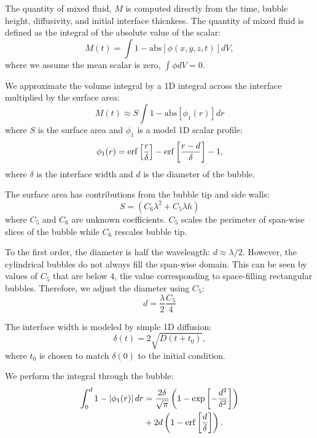 The quantity of mixed fluid, $M$ is computed directly from the time, bubble height, diffusivity, and initial interface thicnkess.
The quantity of mixed fluid is defined as the integral of the absolute value of the scalar:
\begin{equation}
M(t) = \int 1-\text{abs}\left[\phi(x,y,z,t)\right] dV,
\end{equation}
where we assume the mean scalar is zero, $\int \phi dV = 0$.

We approximate the volume integral by a 1D integral across the interface multiplied by the surface area:
\begin{equation}
M(t) \approx S \int 1- \text{abs}\left[\phi_1(r)\right] dr
\end{equation}
where $S$ is the surface area and
$\phi_1$ is a model 1D scalar profile:
\begin{equation}
\phi_1(r) = \operatorname{erf}\left[\frac{r}{\delta}\right] - \operatorname{erf}\left[\frac{r - d}{\delta}\right] - 1,
\end{equation}
where $\delta$ is the interface width and
$d$ is the diameter of the bubble.

The surface area has contributions from the bubble tip and side walls:
\begin{equation}
S = \left(C_6 \lambda^2 + C_5 \lambda h\right)
\end{equation}
where $C_5$ and $C_6$ are unknown coefficients.
$C_5$ scales the perimeter of span-wise slices of the bubble while $C_6$ rescales bubble tip.

To the first order, the diameter is half the wavelength: $d \approx \lambda / 2$.
However, the cylindrical bubbles do not always fill the span-wise domain.
This can be seen by values of $C_5$ that are below $4$, the value corresponding to space-filling rectangular bubbles.
Therefore, we adjust the diameter using $C_5$:
\begin{equation}
d = \frac{\lambda}{2} \frac{C_5}{4}
\end{equation}

The interface width is modeled by simple 1D diffusion:
\begin{equation}
\delta(t) = 2 \sqrt{D (t + t_0)},
\end{equation}
where $t_0$ is chosen to match $\delta(0)$ to the initial condition.

We perform the integral through the bubble:
\begin{equation}
\begin{split}
\int_0^d 1- \left|\phi_1(r)\right| dr &= \frac{2 \delta}{\sqrt{\pi}} \left( 1 - \exp\left[-\frac{d^2}{\delta^2}\right]\right) \\
&+ 2 d \left(1 - \operatorname{erf}\left[\frac{d}{\delta}\right]\right).
\end{split}
\end{equation}



